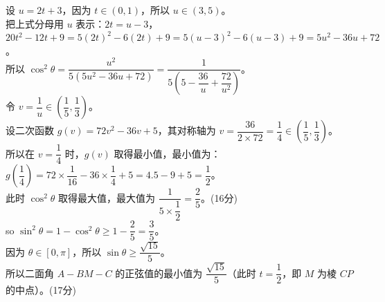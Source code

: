 {  设 \(u = 2t+3\)，因为 \(t \in (0,1)\)，所以 \(u \in (3,5)\)。\\
  把上式分母用 \(u\) 表示：\(2t = u-3\)，\\
  \(20t^2 - 12t + 9 = 5(2t)^2 - 6(2t) + 9 = 5(u-3)^2 - 6(u-3) + 9 = 5u^2 - 36u + 72\)。\\
  所以 \(\cos^2\theta = \dfrac{u^2}{5(5u^2-36u+72)} = \dfrac{1}{5 \left(5 - \dfrac{36}{u} + \dfrac{72}{u^2}\right)}\)。\\
  令 \(v = \dfrac{1}{u} \in \left(\dfrac{1}{5}, \dfrac{1}{3}\right)\)。\\
  设二次函数 \(g(v) = 72v^2 - 36v + 5\)，其对称轴为 \(v = \dfrac{36}{2 \times 72} = \dfrac{1}{4} \in \left(\dfrac{1}{5}, \dfrac{1}{3}\right)\)。\\
  所以在 \(v = \dfrac{1}{4}\) 时，\(g(v)\) 取得最小值，最小值为：\\
  \(g\left(\dfrac{1}{4}\right) = 72 \times \dfrac{1}{16} - 36 \times \dfrac{1}{4} + 5 = 4.5 - 9 + 5 = \dfrac{1}{2}\)。\\
  此时 \(\cos^2\theta\) 取得最大值，最大值为 \(\dfrac{1}{5 \times \dfrac{1}{2}} = \dfrac{2}{5}\)。\hfill (16分)\\
  so \(\sin^2\theta = 1 - \cos^2\theta \geqslant 1 - \dfrac{2}{5} = \dfrac{3}{5}\)。\\
  因为 \(\theta \in [0,\pi]\)，所以 \(\sin\theta \geqslant \dfrac{\sqrt{15}}{5}\)。\\
  所以二面角 \(A-BM-C\) 的正弦值的最小值为 \(\dfrac{\sqrt{15}}{5}\)（此时 \(t = \dfrac{1}{2}\)，即 \(M\) 为棱 \(CP\) 的中点）。\hfill (17分)%
}
\newcommand{\qNineteenDiagnosis}{\errortag{线垂直面定理用错} 第一问中，学生容易直接在没有说明的情况下，就把底面对角线垂直当线面垂直用，遗漏了“相交”和“线在面内”的说明。第二问求法向量及二面角最值代数运算极其容易卡壳。}
\newcommand{\qNineteenTeachingNotes}{此题是典型的新高考立体几何压轴题，重点考查：1. 空间向量建系法；2. 动点坐标的单变量参数化；3. 运用二次函数配方法解决二面角正弦/余弦的最值问题。}
